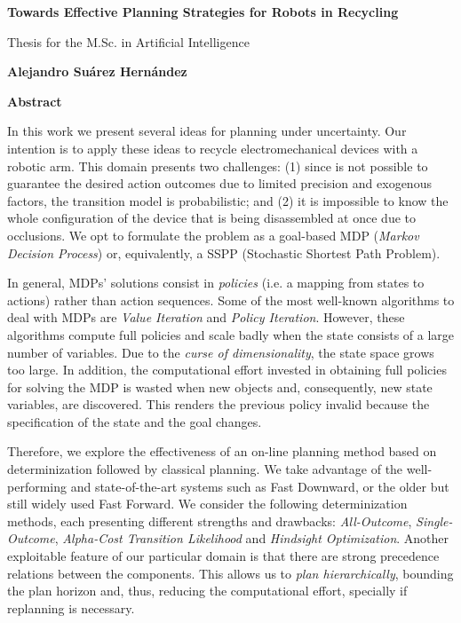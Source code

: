 \thispagestyle{plain}
\begin{center}
	\Large
	\textbf{Towards Effective Planning Strategies for Robots in Recycling}
	
	\vspace{0.4cm}
	\large
	Thesis for the M.Sc. in Artificial Intelligence
	
	\vspace{0.4cm}
	\textbf{Alejandro Suárez Hernández}
	
	\vspace{0.9cm}
	\textbf{Abstract}
\end{center}

In this work we present several ideas for planning under 
uncertainty. Our intention is to apply these ideas to recycle
electromechanical devices with a robotic arm. This domain presents two
challenges: (1) since is not possible to guarantee the desired
action outcomes due to limited precision and exogenous factors,
the transition model
is probabilistic;
and (2) it is impossible to know the whole configuration of the
device that is being
disassembled at once due to occlusions. We opt to
formulate the problem as
a goal-based MDP (\emph{Markov Decision Process}) or, equivalently,
a SSPP
(Stochastic Shortest Path Problem).

In general, MDPs' solutions consist
in \emph{policies} (i.e. a mapping from states to actions) rather than action sequences.
Some of the most well-known algorithms
to deal with MDPs are \emph{Value Iteration} and \emph{Policy Iteration}.
However, these algorithms compute full policies and scale badly
when the state consists of a large number of variables. Due to the
\emph{curse of dimensionality}, the state space grows too large.
In addition, the computational effort invested in obtaining full policies for
solving the MDP is wasted when new objects and, consequently,
new state variables, are discovered. This renders the
previous policy invalid because the specification of the state
and the goal changes.

Therefore, we explore the effectiveness of an on-line planning method
based on determinization followed by classical planning. We take advantage
of the well-performing and state-of-the-art systems such as Fast Downward,
or the older but still widely used Fast Forward. We consider the following
determinization methods, each presenting different strengths and
drawbacks: \emph{All-Outcome}, \emph{Single-Outcome}, \emph{Alpha-Cost Transition
Likelihood} and \emph{Hindsight Optimization}. Another exploitable feature
of our particular domain is that there are strong precedence relations
between the components. This allows us to \emph{plan hierarchically},
bounding the plan horizon and, thus, reducing the computational effort,
specially if replanning is necessary.


